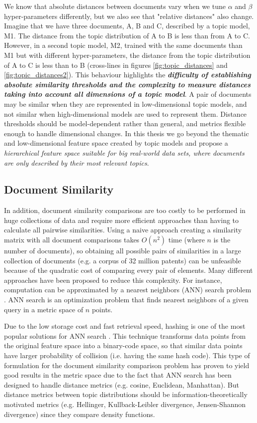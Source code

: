 We know that absolute distances between documents vary when we tune $\alpha$ and $\beta$ hyper-parameters differently, but we also see that "relative distances" also change. Imagine that we have three documents, A, B and C, described by a topic model, M1. The distance from the topic distribution of A to B is less than from A to C. However, in a second topic model, M2, trained with the same documents than M1 but with different hyper-parameters, the distance from the topic distribution of A to C is less than to B (cross-lines in figures \ref{fig:topic_distances} and \ref{fig:topic_distances2}). This behaviour highlights the \textbf{\textit{difficulty of establishing absolute similarity thresholds and the complexity to measure distances taking into account all dimensions of a topic model}}. A pair of documents may be similar when they are represented in low-dimensional topic models, and not similar when high-dimensional models are used to represent them. Distance thresholds should be model-dependent rather than general, and metrics flexible enough to handle dimensional changes. In this thesis we go beyond the thematic and low-dimensional feature space created by topic models and propose a \textit{hierarchical feature space suitable for big real-world data sets, where documents are only described by their most relevant topics}.


\subsection{Document Similarity}
\label{sec:document-similarity}

In addition, document similarity comparisons are too costly to be performed in huge collections of data and require more efficient approaches than having to calculate all pairwise similarities. Using a naive approach creating a similarity matrix with all document comparisons takes $O(n^2)$ time (where $n$ is the number of documents), so obtaining all possible pairs of similarities in a large collection of documents (e.g. a corpus of 32 million patents) can be unfeasible because of the quadratic cost of comparing every pair of elements. Many different approaches have been proposed to reduce this complexity. For instance, computation can be approximated by a nearest neighbors (ANN) search problem \citep{Indyk1998}. ANN search is an optimization problem that finds nearest neighbors of a given query in a metric space of $n$ points. 

Due to the low storage cost and fast retrieval speed, hashing is one of the most popular solutions for ANN search \citep{Zhen2016}. This technique transforms data points from the original feature space into a binary-code space, so that similar data points have larger probability of collision (i.e. having the same hash code). This type of formulation for the document similarity comparison problem has proven to yield good results in the metric space \citep{Krstovski2011} due to the fact that ANN search has been designed to handle distance metrics (e.g. cosine, Euclidean, Manhattan). But distance metrics between topic distributions should be information-theoretically motivated metrics (e.g. Hellinger, Kullback-Leibler divergence, Jensen-Shannon divergence) since they compare density functions. 

